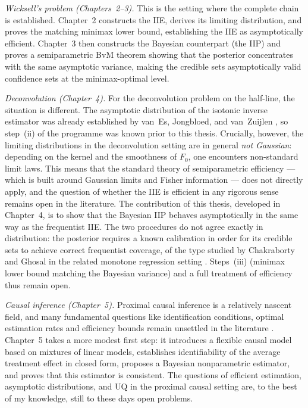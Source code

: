\smallskip
\noindent\textit{Wicksell's problem (Chapters~2--3).}
This is the setting where the complete chain is established. Chapter~2 constructs the IIE, derives its limiting distribution, and proves the matching minimax lower bound, establishing the IIE as asymptotically efficient. Chapter~3 then constructs the Bayesian counterpart (the IIP) and proves a semiparametric BvM theorem showing that the posterior concentrates with the same asymptotic variance, making the credible sets asymptotically valid confidence sets at the minimax-optimal level. 

\smallskip
\noindent\textit{Deconvolution (Chapter~4).}
For the deconvolution problem on the half-line, the situation is different. The asymptotic distribution of the isotonic inverse estimator was already established by van~Es, Jongbloed, and van~Zuijlen \cite{74}, so step~(ii) of the programme was known prior to this thesis. Crucially, however, the limiting distributions in the deconvolution setting are in general \textit{not Gaussian}: depending on the kernel and the smoothness of $F_0$, one encounters non-standard limit laws. This means that the standard theory of semiparametric efficiency --- which is built around Gaussian limits and Fisher information --- does not directly apply, and the question of whether the IIE is efficient in any rigorous sense remains open in the literature. The contribution of this thesis, developed in Chapter~4, is to show that the Bayesian IIP behaves asymptotically in the same way as the frequentist IIE. The two procedures do not agree exactly in distribution: the posterior requires a known calibration in order for its credible sets to achieve correct frequentist coverage, of the type studied by Chakraborty and Ghosal in the related monotone regression setting \cite{54,60}. Steps~(iii) (minimax lower bound matching the Bayesian variance) and a full treatment of efficiency thus remain open.

\smallskip
\noindent\textit{Causal inference (Chapter~5).}
Proximal causal inference is a relatively nascent field, and many fundamental questions like identification conditions, optimal estimation rates and efficiency bounds remain unsettled in the literature \cite{205,120}. Chapter~5 takes a more modest first step: it introduces a flexible causal model based on mixtures of linear models, establishes identifiability of the average treatment effect in closed form, proposes a Bayesian nonparametric estimator, and proves that this estimator is consistent. The questions of efficient estimation, asymptotic distributions, and UQ in the proximal causal setting are, to the best of my knowledge, still to these days open problems.

